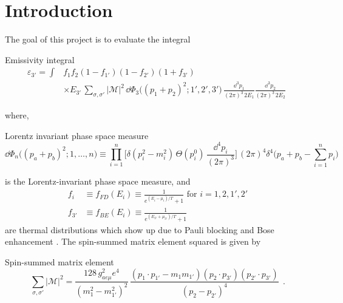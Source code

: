 \section{Introduction}
\label{sec:introduction}
The goal of this project is to evaluate the integral 

\begin{bluenv}{Emissivity integral}
    \begin{equation}
    \label{eq:emissivity-integral}
    \begin{aligned}
        \varepsilon_{3'} = \int 
            & f_1 f_2 (1 - f_{1'}) (1 - f_{2'}) (1 + f_{3'}) \\
            &\times E_{3'} \,
            \sum_{\sigma, \sigma'} | \mathcal{M} |^2 \,
            \dd \Phi_3 \big( (p_1 + p_2)^2; 1', 2', 3'\big)
            \,
            \frac{\dd^3 p_1}{(2\pi)^3\,2 E_1}
            \frac{\dd^3 p_2}{(2\pi)^3\,2 E_2} 
            \; 
    \end{aligned}
    \end{equation}
\end{bluenv}
where, 
\begin{bluenv}{Lorentz invariant phase space measure}
    \begin{equation}
        \label{eq:LIPS}
        \dd \Phi_n \big((p_a + p_b)^2; 1, \ldots, n \big) \equiv 
        \prod_{i=1}^{n}
        \bigg[
             \delta (p_i^2 - m_i^2) \, \Theta(p_i^0) \, 
            \frac{\dd^4 p_i}{(2\pi)^3}
        \bigg] \, (2\pi)^4 \delta^4 
        \bigg( 
            p_a + p_b - \sum_{i=1}^{n} p_i
        \bigg) \quad 
    \end{equation}
\end{bluenv}
is the Lorentz-invariant phase space measure, and
\begin{align}
    f_i &\equiv f_{FD}(E_i) \equiv \frac{1}{e^{(E_i - \mu_i)/T} + 1} \text{ for } i = 1, 2, 1', 2' \\
    f_{3'} &\equiv f_{BE}(E_i) \equiv \frac{1}{e^{(E_{3'} + \mu_{3'})/T} + 1}
\end{align}
are thermal distributions which show up due to Pauli blocking and Bose enhancement . 
The spin-summed matrix element squared is given by
\begin{bluenv}{Spin-summed matrix element}
    \begin{equation}
        \label{eq:matrix-element}
        \sum_{\sigma, \sigma'} | \mathcal{M} |^2 
            = 
            \frac{128 \, g^2_{ae\mu} e^4}{(m_1^2 - m_{1'}^2)^2} \,
            \frac{
                 (p_1 \cdot p_{1'} - m_1 m_{1'})
                (p_2 \cdot p_{3'})
                (p_{2'} \cdot p_{3'})
            }
            {
                (p_2 - p_{2'})^4
            } \; \, .
    \end{equation}
\end{bluenv}


